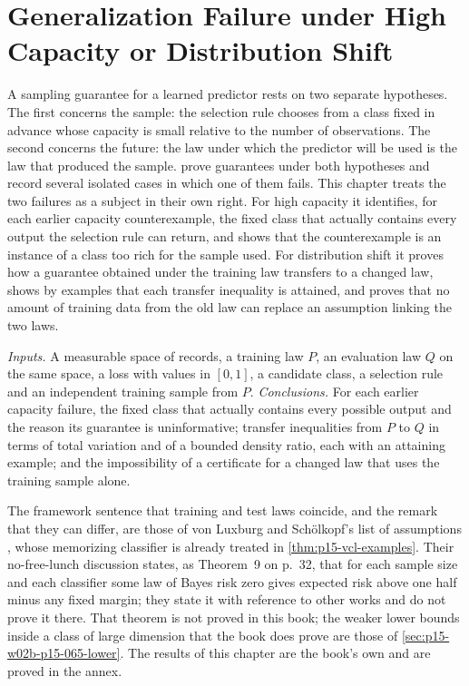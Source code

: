 \chapter{Generalization Failure under High Capacity or Distribution Shift}
\label{sec:p15-w02b-p15-066}

A sampling guarantee for a learned predictor rests on two separate
hypotheses. The first concerns the sample: the selection rule chooses
from a class fixed in advance whose capacity is small relative to the
number of observations. The second concerns the future: the law under
which the predictor will be used is the law that produced the sample.
prove guarantees under both hypotheses and record several isolated
cases in which one of them fails. This chapter treats the two failures
as a subject in their own right. For high capacity it identifies, for
each earlier capacity counterexample, the fixed class that actually
contains every output the selection rule can return, and shows that the
counterexample is an instance of a class too rich for the sample used. For distribution
shift it proves how a guarantee obtained under the training law
transfers to a changed law, shows by examples that each transfer
inequality is attained, and proves that no amount of training data
from the old law can replace an assumption linking the two laws.

\emph{Inputs.} A measurable space of records, a training law \(P\),
an evaluation law \(Q\) on the same space, a loss with values in
\([0,1]\), a candidate class, a selection rule and an independent
training sample from \(P\).
\emph{Conclusions.} For each earlier capacity failure, the fixed class that
actually contains every possible output and the reason its guarantee is
uninformative; transfer inequalities from \(P\) to \(Q\) in terms of
total variation and of a bounded density ratio, each with an attaining
example; and the impossibility of a certificate for a changed law that
uses the training sample alone.

The framework sentence that training and test laws coincide, and the
remark that they can differ, are those of von Luxburg and
Sch\"olkopf's list of assumptions
\cite[Section~2.2, pp.~3--4]{LuxburgScholkopf2008Author}, whose
memorizing classifier \cite[Section~4.2, pp.~13--14]{LuxburgScholkopf2008Author}
is already treated in \cref{thm:p15-vcl-examples}. Their no-free-lunch
discussion \cite[Section~8, pp.~30--32]{LuxburgScholkopf2008Author}
states, as Theorem~9 on p.~32, that for each sample size and each
classifier some law of Bayes risk zero gives expected risk above one
half minus any fixed margin; they state it with reference to other
works and do not prove it there. That theorem is not proved in this
book; the weaker lower bounds inside a class of large dimension that the
book does prove are those of \cref{sec:p15-w02b-p15-065-lower}. The
results of this chapter are the book's own and are proved in the annex.

